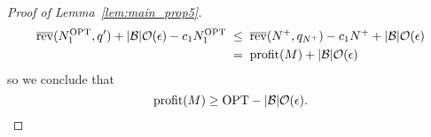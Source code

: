 \begin{proof}[Proof of Lemma~\ref{lem:main_prop5}]
\begin{align*}
    \overline{\mathrm{rev}}(N_1^{\rm OPT}, q') + |\mathcal{B}|\mathcal{O}(\epsilon)- c_1N_1^{\rm OPT}  
      \; &\leq \; \overline{\mathrm{rev}}(N^{+}, q_{N^{+}})- c_1 N^{+}  + |\mathcal{B}|\mathcal{O}(\epsilon) 
      \\
      &= \; {\rm profit}(M) + |\mathcal{B}|\mathcal{O}(\epsilon)
\end{align*}
so we conclude that 
\begin{equation*}
    {\rm profit}(M) 
    \geq 
    {\rm OPT}
    - 
    |\mathcal{B}|\mathcal{O}(\epsilon) .
\end{equation*}


\end{proof} 










